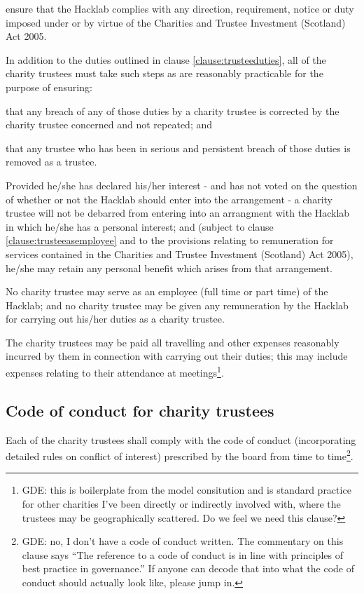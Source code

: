 \documentclass{article}
\newcommand{\charityact}{Charities and Trustee Investment (Scotland) Act 2005}
\begin{document}
\subclause ensure that the Hacklab complies with any direction,
requirement, notice or duty imposed under or by virtue of the
\charityact.

\clause In addition to the duties outlined in clause
\ref{clause:trusteeduties}, all of the charity trustees must take such 
steps as are reasonably practicable for the purpose of ensuring:

\subclause that any breach of any of those duties by a charity trustee
is corrected by the charity trustee concerned and not repeated; and

\subclause that any trustee who has been in serious and persistent
breach of those duties is removed as a trustee.

\clause Provided he/she has declared his/her interest - and has not
voted on the question of whether or not the Hacklab should enter into
the arrangement - a charity trustee will not be debarred from entering
into an arrangment with the Hacklab in which he/she has a personal
interest; and (subject to clause \ref{clause:trusteeasemployee} and to
the provisions relating to remuneration for services contained in the
\charityact), he/she may
retain any personal benefit which arises from that arrangement.

\clause\label{clause:trusteeasemployee}No charity trustee may serve as
an employee (full time or part time) of the Hacklab; and no
charity trustee may be given any remuneration by the Hacklab for
carrying out his/her duties as a charity trustee.

\clause The charity trustees may be paid all travelling and other
expenses reasonably incurred by them in connection with carrying out
their duties; this may include expenses relating to their attendance
at meetings\footnote{GDE: this is boilerplate from the model
  consitution and is standard practice for other charities I've been
  directly or indirectly involved with, where the trustees may be
  geographically scattered. Do we feel we need this clause?}.

\subsection{Code of conduct for charity trustees}

\clause Each of the charity trustees shall comply with the code of
conduct (incorporating detailed rules on conflict of interest)
prescribed by the board from time to time\footnote{GDE: no, I don't
  have a code of conduct written. The commentary on this clause says
  ``The reference to a code of conduct is in line with principles of
  best practice in governance.'' If anyone can decode that into what
  the code of conduct should actually look like, please jump in.}.
\end{document}
